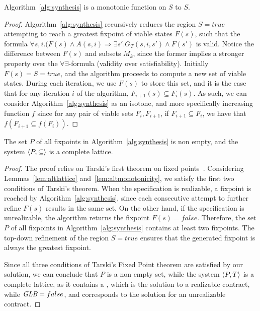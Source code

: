 \begin{lemma} Algorithm~\ref{alg:synthesis} is a monotonic function on $S$ to $S$.
\label{lm:altmonotonicity}
\end{lemma}
\begin{proof}
Algorithm~\ref{alg:synthesis} recursively reduces the region $S = true$ attempting to reach a greatest fixpoint of viable states $F(s)$, such that the formula $\forall s, i. (F(s) \land A(s,i) \Rightarrow \exists s'. G_T(s,i,s') \land F(s')$ is valid. Notice the difference between $F(s)$ and subsets $M_k$, since the former implies a stronger property over the $\forall\exists$-formula (validity over satisfiability). Initially $F(s) = S = true$, and the algorithm proceeds to compute a new set of viable states. During each iteration, we use $F(s)$ to store this set, and it is the case that for any iteration $i$ of the algorithm, $F_{i+1}(s) \subseteq F_{i}(s)$. As such, we can consider Algorithm~\ref{alg:synthesis} as an isotone, and more specifically increasing function $f$ since for any pair of viable sets $F_{i}, F_{i+1}$, if $F_{i+1} \subseteq F_{i}$, we have that $f(F_{i+1} \subseteq f(F_{i}))$.
\end{proof}

\begin{theorem}
The set $P$ of all fixpoints in Algorithm~\ref{alg:synthesis} is non
empty, and the system $\langle P, \subseteq \rangle$ is a complete lattice.
\label{thm:altfixpoint}
\end{theorem}
\begin{proof}
The proof relies on Tarski's first theorem on fixed
points~\cite{tarski1955lattice}.
Considering Lemmas~\ref{lem:altlattice} and~\ref{lem:altmonotonicity}, we satisfy the first two
conditions of Tarski's theorem. When the specification is realizable, a
fixpoint is reached by Algorithm~\ref{alg:synthesis}, since each consecutive
attempt to further refine $F(s)$ results in the same set. On the other hand, if
the specification is unrealizable, the algorithm returns the fixpoint $F(s) = false$. Therefore, the
set $P$ of all fixpoints in Algorithm~\ref{alg:synthesis} contains at least two
fixpoints. The top-down refinement of the region $S = true$ ensures that the generated fixpoint is always the greatest fixpoint.

Since all three conditions of Tarski's Fixed Point theorem are satisfied by our
solution, we can conclude that $P$ is a non empty set, while the system
$\langle P, T \rangle$ is a complete lattice, as it contains a \lub, which is
the solution to a realizable contract, while $\textit {GLB} = false$, and corresponds to
the solution for an unrealizable contract.
\end{proof}

